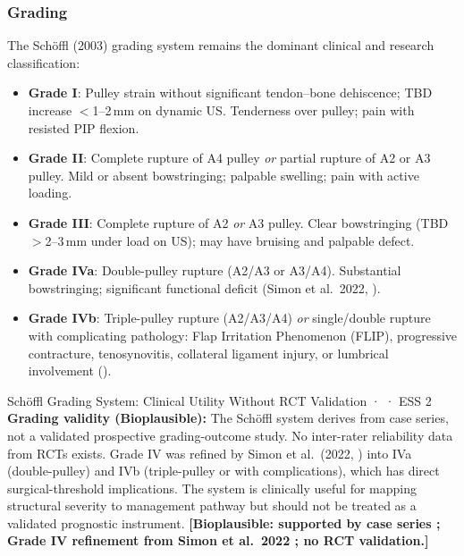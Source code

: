 \subsubsection{Grading}

The Sch\"{o}ffl (2003) grading system \cite{SHWS03} remains the dominant clinical and research classification:

\begin{itemize}[leftmargin=1.5em]
  \item \textbf{Grade I}: Pulley strain without significant tendon--bone dehiscence; TBD increase $<$1--2\,mm on dynamic US. Tenderness over pulley; pain with resisted PIP flexion.
  \item \textbf{Grade II}: Complete rupture of A4 pulley \textit{or} partial rupture of A2 or A3 pulley. Mild or absent bowstringing; palpable swelling; pain with active loading.
  \item \textbf{Grade III}: Complete rupture of A2 \textit{or} A3 pulley. Clear bowstringing (TBD $>$2--3\,mm under load on US); may have bruising and palpable defect.
  \item \textbf{Grade IVa}: Double-pulley rupture (A2/A3 or A3/A4). Substantial bowstringing; significant functional deficit (Simon et al.\ 2022, \cite{SLTS22}).
  \item \textbf{Grade IVb}: Triple-pulley rupture (A2/A3/A4) \textit{or} single/double rupture with complicating pathology: Flap Irritation Phenomenon (FLIP), progressive contracture, tenosynovitis, collateral ligament injury, or lumbrical involvement (\cite{SLTS22}).
\end{itemize}

\begin{bioplausbox}{Schöffl Grading System: Clinical Utility Without RCT Validation · \bioplausible · ESS 2}
\textbf{Grading validity (Bioplausible):} The Sch\"{o}ffl system derives from case series, not a validated prospective grading-outcome study. No inter-rater reliability data from RCTs exists. Grade IV was refined by Simon et al.\ (2022, \cite{SLTS22}) into IVa (double-pulley) and IVb (triple-pulley or with complications), which has direct surgical-threshold implications. The system is clinically useful for mapping structural severity to management pathway but should not be treated as a validated prognostic instrument. \textbf{[Bioplausible: supported by case series \cite{SHWS03}; Grade IV refinement from Simon et al.\ 2022 \cite{SLTS22}; no RCT validation.]}
\end{bioplausbox}


